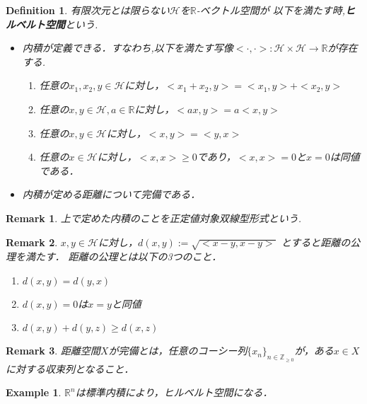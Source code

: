 \documentclass{ujarticle}
\newtheorem{dfn}[thm]{Definition}
\newtheorem{epl}[thm]{Example}
\newtheorem*{rem}{Remark}
\begin{document}
\begin{dfn}
  有限次元とは限らない$\mathcal{H}$を$\mathbb{R}$-ベクトル空間が
  以下を満たす時,\textbf{ヒルベルト空間}という.
  \begin{itemize}
    \item 内積が定義できる．すなわち,以下を満たす写像$< \cdot , \cdot >: \mathcal{H} \times \mathcal{H} \to \mathbb{R}$が存在する.
      \begin{enumerate}
        \item 任意の$x_1,x_2,y \in \mathcal{H}$に対し，${<}x_1 +x_2,y{>}= {<}x_1,y{>} +{<}x_2,y{>}$
        \item 任意の$x,y \in \mathcal{H},a \in \mathbb{R}$に対し，$<ax,y> =a<x,y>$
        \item 任意の$x,y \in \mathcal{H}$に対し，$<x,y>=<y,x>$
        \item 任意の$x \in \mathcal{H}$に対し，${<}x,x{>} \ge 0$であり，${<}x,x{>}=0$と$x=0$は同値である．
      \end{enumerate}
    \item 内積が定める距離について完備である．
  \end{itemize}
\end{dfn}
\begin{rem}
上で定めた内積のことを正定値対象双線型形式という.
\end{rem}
\begin{rem}
  $x,y \in \mathcal{H}$に対し，$d(x,y):=\sqrt{{<}x-y,x-y{>}}$
 とすると距離の公理を満たす．
 距離の公理とは以下の3つのこと．
 \begin{enumerate}
   \item $d(x,y)=d(y,x)$
   \item $d(x,y)=0$は$x=y$と同値
   \item $d(x,y)+d(y,z) \ge d(x,z)$
 \end{enumerate}
\end{rem}
\begin{rem}
 距離空間$X$が完備とは，任意のコーシー列$\{x_n\}_{n \in \mathbb{Z}_{\ge 0}}$が，ある$x \in X$に対する収束列となること．
\end{rem}
\begin{epl}
 $\mathbb{R}^n$は標準内積により，ヒルベルト空間になる．
\end{epl}
\end{document}
